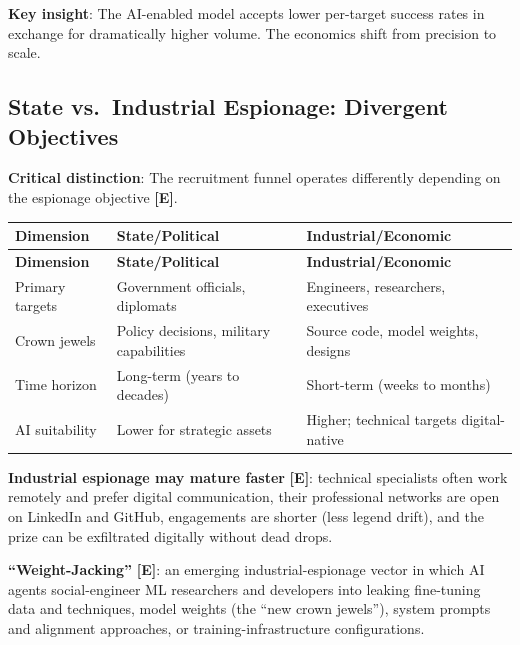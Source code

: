 \documentclass[11pt,letterpaper]{article}
\begin{document}
\textbf{Key insight}: The AI-enabled model accepts lower per-target success rates in exchange for dramatically higher volume. The economics shift from precision to scale.

\subsection{State vs.\ Industrial Espionage: Divergent Objectives}

\textbf{Critical distinction}: The recruitment funnel operates differently depending on the espionage objective \textbf{[E]}.

{\small
\begin{longtable}{L{3cm}L{4.5cm}L{5cm}}
\toprule
\textbf{Dimension} & \textbf{State/Political} & \textbf{Industrial/Economic} \\
\midrule
\endfirsthead
\toprule
\textbf{Dimension} & \textbf{State/Political} & \textbf{Industrial/Economic} \\
\midrule
\endhead
Primary targets & Government officials, diplomats & Engineers, researchers, executives \\*
Crown jewels & Policy decisions, military capabilities & Source code, model weights, designs \\
Time horizon & Long-term (years to decades) & Short-term (weeks to months) \\*
AI suitability & Lower for strategic assets & Higher; technical targets digital-native \\
\bottomrule
\end{longtable}}

\textbf{Industrial espionage may mature faster} \textbf{[E]}: technical specialists often work remotely and prefer digital communication, their professional networks are open on LinkedIn and GitHub, engagements are shorter (less legend drift), and the prize can be exfiltrated digitally without dead drops.

\textbf{``Weight-Jacking''} \textbf{[E]}: an emerging industrial-espionage vector in which AI agents social-engineer ML researchers and developers into leaking fine-tuning data and techniques, model weights (the ``new crown jewels''), system prompts and alignment approaches, or training-infrastructure configurations.
\end{document}
